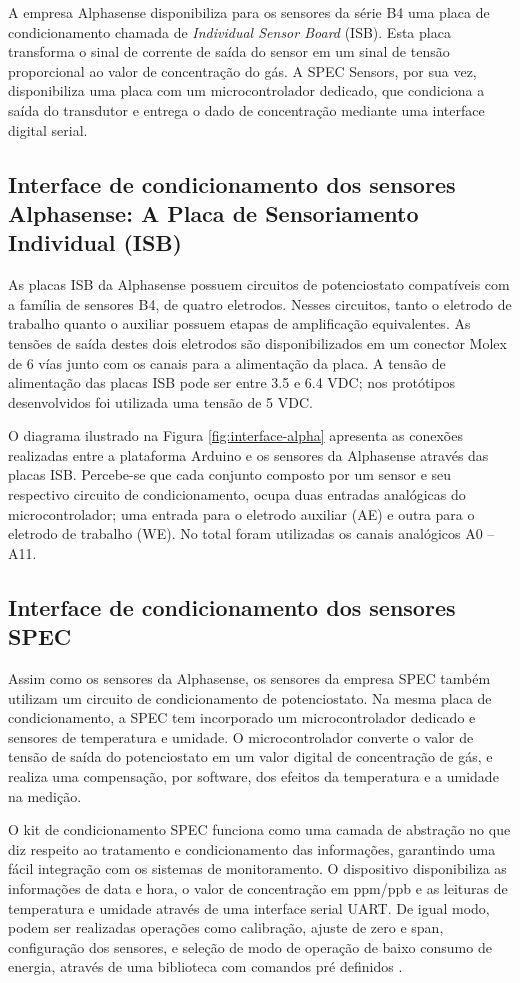 A empresa Alphasense disponibiliza para os sensores da série B4 uma placa de condicionamento chamada de \textit{Individual Sensor Board} (ISB). Esta placa transforma o sinal de corrente de saída do sensor em um sinal de tensão proporcional ao valor de concentração do gás. A SPEC Sensors, por sua vez, disponibiliza uma placa com um microcontrolador dedicado, que condiciona a saída do transdutor e entrega o dado de concentração mediante uma interface digital serial.

\subsection{Interface de condicionamento dos sensores Alphasense: A Placa de Sensoriamento Individual (ISB)}
As placas ISB da Alphasense possuem circuitos de potenciostato compatíveis com a família de sensores B4, de quatro eletrodos. Nesses circuitos, tanto o eletrodo de trabalho quanto o auxiliar possuem etapas de amplificação equivalentes. As tensões de saída destes dois eletrodos são disponibilizados em um conector Molex de 6 vías junto com os canais para a alimentação da placa. A tensão de alimentação das placas ISB pode ser entre 3.5 e 6.4 VDC; nos protótipos desenvolvidos foi utilizada uma tensão de 5 VDC.

O diagrama ilustrado na Figura \ref{fig:interface-alpha} apresenta as conexões realizadas entre a plataforma Arduino e os sensores da Alphasense através das placas ISB. Percebe-se que cada conjunto composto por um sensor e seu respectivo circuito de condicionamento, ocupa duas entradas analógicas do microcontrolador; uma entrada para o eletrodo auxiliar (AE) e outra para o eletrodo de trabalho (WE). No total foram utilizadas os canais analógicos A0 – A11.

\subsection{Interface de condicionamento dos sensores SPEC}
Assim como os sensores da Alphasense, os sensores da empresa SPEC também utilizam um circuito de condicionamento de potenciostato. Na mesma placa de condicionamento, a SPEC tem incorporado um microcontrolador dedicado e sensores de temperatura e umidade. O microcontrolador converte o valor de tensão de saída do potenciostato em um valor digital de concentração de gás, e realiza uma compensação, por software, dos efeitos da temperatura e a umidade na medição.

O kit de condicionamento SPEC funciona como uma camada de abstração no que diz respeito ao tratamento e condicionamento das informações, garantindo uma fácil integração com os sistemas de monitoramento. O dispositivo disponibiliza as informações de data e hora, o valor de concentração em ppm/ppb e as leituras de temperatura e umidade através de uma interface serial UART. De igual modo, podem ser realizadas operações como calibração, ajuste de zero e span, configuração dos sensores, e seleção de modo de operação de baixo consumo de energia, através de uma biblioteca com comandos pré definidos \cite{SPECSensors2017Digital968-045}.

